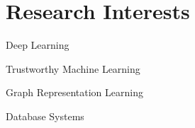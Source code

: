
\section{Research Interests}\vspace{-1.0em}

\begin{multicols}{2}
	\begin{compactitem}
		\item {Deep Learning} 
		\item Trustworthy Machine Learning 
		\item Graph Representation Learning 
		\item Database Systems 
	\end{compactitem}
\end{multicols}
